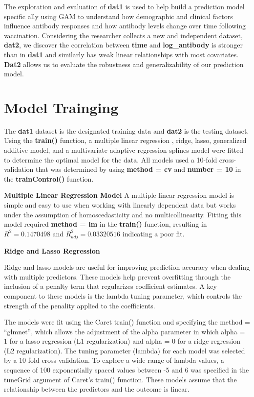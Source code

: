 \documentclass[
]{article}
\begin{document}
The exploration and evaluation of \textbf{dat1} is used to help build a prediction model specific ally using GAM to understand how demographic and clinical factors influence antibody responses and how antibody levels change over time following vaccination. Considering the researcher collects a new and independent dataset, \textbf{dat2}, we discover the correlation between \textbf{time} and \textbf{log\_antibody} is stronger than in \textbf{dat1} and similarly has weak linear relationships with most covariates. \textbf{Dat2} allows us to evaluate the robustness and generalizability of our prediction model.

\section{Model Trainging}\label{model-trainging}

The \textbf{dat1} dataset is the designated training data and \textbf{dat2} is the testing dataset. Using the \textbf{train()} function, a multiple linear regression , ridge, lasso, generalized additive model, and a multivariate adaptive regression splines model were fitted to determine the optimal model for the data. All models used a 10-fold cross-validation that was determined by using \textbf{method = cv} and \textbf{number = 10} in the \textbf{trainControl()} function.

\textbf{Multiple Linear Regression Model}
A multiple linear regression model is simple and easy to use when working with linearly dependent data but works under the assumption of homoscedasticity and no multicollinearity. Fitting this model required \textbf{method = lm} in the \textbf{train()} function, resulting in \(R^2 = 0.1470498\) and \(R_{adj}^2 = 0.03320516\) indicating a poor fit.

\textbf{Ridge and Lasso Regression}

Ridge and lasso models are useful for improving prediction accuracy when dealing with multiple predictors. These models help prevent overfitting through the inclusion of a penalty term that regularizes coefficient estimates. A key component to these models is the lambda tuning parameter, which controls the strength of the penality applied to the coefficients.

The models were fit using the Caret train() function and specifying the method = ``glmnet'', which allows the adjustment of the alpha parameter in which alpha = 1 for a lasso regression (L1 regularization) and alpha = 0 for a ridge regression (L2 regularization). The tuning parameter (lambda) for each model was selected by a 10-fold cross-validation. To explore a wide range of lambda values, a sequence of 100 exponentially spaced values between -5 and 6 was specified in the tuneGrid argument of Caret's train() function. These models assume that the relationship between the predictors and the outcome is linear.
\end{document}
